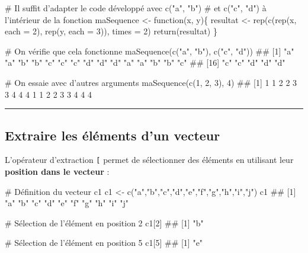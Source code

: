 \documentclass[12pt,twosided, notitlepage]{book}
\newenvironment{Shaded}{}{}
\newcommand{\KeywordTok}[1]{\textcolor[rgb]{0.00,0.00,1.00}{{#1}}}
\newcommand{\DataTypeTok}[1]{{#1}}
\newcommand{\DecValTok}[1]{{#1}}
\newcommand{\StringTok}[1]{\textcolor[rgb]{0.00,0.50,0.50}{{#1}}}
\newcommand{\CommentTok}[1]{\textcolor[rgb]{0.00,0.50,0.00}{{#1}}}
\newcommand{\NormalTok}[1]{{#1}}
\renewenvironment{Shaded}{\begin{snugshade}}{\end{snugshade}}
\begin{document}
\begin{enumerate}
\begin{Shaded}
\begin{Highlighting}[]
\CommentTok{# Il suffit d'adapter le code développé avec c("a", "b")}
\CommentTok{# et c("c", "d") à l'intérieur de la fonction}
\NormalTok{maSequence <-}\StringTok{ }\NormalTok{function(x, y)\{}
  \NormalTok{resultat <-}\StringTok{ }\KeywordTok{rep}\NormalTok{(}\KeywordTok{c}\NormalTok{(}\KeywordTok{rep}\NormalTok{(x, }\DataTypeTok{each =} \DecValTok{2}\NormalTok{), }\KeywordTok{rep}\NormalTok{(y, }\DataTypeTok{each =} \DecValTok{3}\NormalTok{)), }\DataTypeTok{times =} \DecValTok{2}\NormalTok{)}
  \KeywordTok{return}\NormalTok{(resultat)}
\NormalTok{\}}

\CommentTok{# On vérifie que cela fonctionne}
\KeywordTok{maSequence}\NormalTok{(}\KeywordTok{c}\NormalTok{(}\StringTok{"a"}\NormalTok{, }\StringTok{"b"}\NormalTok{), }\KeywordTok{c}\NormalTok{(}\StringTok{"c"}\NormalTok{, }\StringTok{"d"}\NormalTok{))}
  \NormalTok{##  [1] "a" "a" "b" "b" "c" "c" "c" "d" "d" "d" "a" "a" "b" "b" "c"}
  \NormalTok{## [16] "c" "c" "d" "d" "d"}

\CommentTok{# On essaie avec d'autres arguments}
\KeywordTok{maSequence}\NormalTok{(}\KeywordTok{c}\NormalTok{(}\DecValTok{1}\NormalTok{, }\DecValTok{2}\NormalTok{, }\DecValTok{3}\NormalTok{), }\DecValTok{4}\NormalTok{)}
  \NormalTok{##  [1] 1 1 2 2 3 3 4 4 4 1 1 2 2 3 3 4 4 4}
\end{Highlighting}
\end{Shaded}

  \begin{center} \rule{0.5\linewidth}{\linethickness}\end{center}

  \bigskip  \fi 
\end{enumerate}

\subsection{Extraire les éléments d'un
vecteur}\label{extraire-les-elements-dun-vecteur}

L'opérateur d'extraction \texttt{{[}} permet de sélectionner des
éléments en utilisant leur \textbf{position dans le vecteur} :

\begin{Shaded}
\begin{Highlighting}[]
\CommentTok{# Définition du vecteur c1}
\NormalTok{c1 <-}\StringTok{ }\KeywordTok{c}\NormalTok{(}\StringTok{"a"}\NormalTok{,}\StringTok{"b"}\NormalTok{,}\StringTok{"c"}\NormalTok{,}\StringTok{"d"}\NormalTok{,}\StringTok{"e"}\NormalTok{,}\StringTok{"f"}\NormalTok{,}\StringTok{"g"}\NormalTok{,}\StringTok{"h"}\NormalTok{,}\StringTok{"i"}\NormalTok{,}\StringTok{"j"}\NormalTok{)}
\NormalTok{c1}
  \NormalTok{##  [1] "a" "b" "c" "d" "e" "f" "g" "h" "i" "j"}

\CommentTok{# Sélection de l'élément en position 2}
\NormalTok{c1[}\DecValTok{2}\NormalTok{]}
  \NormalTok{## [1] "b"}

\CommentTok{# Sélection de l'élément en position 5}
\NormalTok{c1[}\DecValTok{5}\NormalTok{]}
  \NormalTok{## [1] "e"}
\end{Highlighting}
\end{Shaded}
\end{document}
